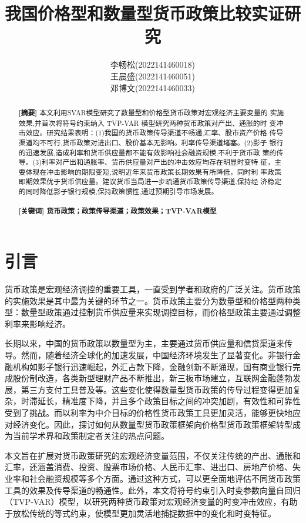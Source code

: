 \documentclass{ijclclp}
\title{我国价格型和数量型货币政策比较实证研究}
\author{李畅松(2022141460018)
        \\
        王晨盛(2022141460051)
        \\
        邓博文(2022141460033)}
\begin{document}
\maketitle
\thispagestyle{firstpage}
\begin{abstract}
\textbf{ [摘要] }%
本文利用SVAR模型研究了数量型和价格型货币政策对宏观经济主要变量的
实施效果,并首次将符号约束纳入 TVP-VAR 模型研究两种货币政策对产出、通胀的时
变冲击效应。研究结果表明：(1)我国的货币政策传导渠道不畅通,汇率、股市资产价格
传导渠道均不可行,货币政策对进出口、股价基本无影响。利率传导渠道堵塞。(2)影子
银行的迅速发展,造成利率和货币供应量都不能有效影响社会融资规模,不利于货币政
策的传导。(3)利率对产出和通胀率、货币供应量对产出的冲击效应均存在明显时变特
征，主要体现在冲击影响的期限变短,说明近年来货币政策长期效果有所降低，同时利
率政策即期效果优于货币供应量。建议货币当局进一步疏通货币政策传导渠道,保持经
济稳定的同时降低影子银行规模,保持政策惯性,通过预期引导市场发展。
\\ 
\\
\textbf{ [关键词] 货币政策；政策传导渠道；政策效果；TVP-VAR模型} 

\end{abstract}

\section{引言}
\textbf{ }
货币政策是宏观经济调控的重要工具，一直受到学者和政府的广泛关注。货币政策的实施效果是其中最为关键的环节之一。货币政策主要分为数量型和价格型两种类型：数量型政策通过控制货币供应量来实现调控目标，而价格型政策主要通过调整利率来影响经济。

长期以来，中国的货币政策以数量型为主，主要通过货币供应量和信贷渠道来传导。然而，随着经济全球化的加速发展，中国经济环境发生了显著变化。非银行金融机构如影子银行迅速崛起，外汇占款下降，金融创新不断涌现，国有商业银行完成股份制改造，各类新型理财产品不断推出，新三板市场建立，互联网金融蓬勃发展，第三方支付工具普及等。这些变化使得数量型货币政策的传导过程变得更加复杂，时滞延长，精准度下降，并且多个政策目标之间的冲突加剧，有效性和可靠性受到了挑战。而以利率为中介目标的价格性货币政策工具更加灵活，能够更快地应对经济变化。因此，探讨如何从数量型货币政策框架向价格型货币政策框架转型成为当前学术界和政策制定者关注的热点问题。

本文旨在扩展对货币政策研究的宏观经济变量范围，不仅关注传统的产出、通胀和汇率，还涵盖消费、投资、股票市场价格、人民币汇率、进出口、房地产价格、失业率和社会融资规模等多个方面。通过这种方式，可以更全面地评估不同货币政策工具的效果及传导渠道的畅通性。此外，本文将符号约束引入时变参数向量自回归（TVP-VAR）模型，以研究两种货币政策对宏观经济变量的时变冲击效应，有助于放松传统的等式约束，使模型更加灵活地捕捉数据中的变化和时变特征。
\\
\end{document}
